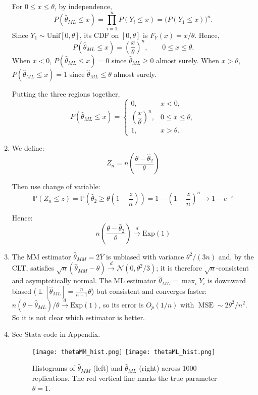 \documentclass[12pt]{article}
\DeclareMathOperator{\E}{\mathbb{E}}
\DeclareMathOperator{\MSE}{MSE}
\begin{document}
\begin{flushleft}
\begin{enumerate}[label=(\alph*)]
For $0\le x\le \theta$, by independence,
\[
P(\hat\theta_{ML} \le x)
= \prod_{i=1}^n P(Y_i \le x)
= \big(P(Y_1 \le x)\big)^n.
\]
Since $Y_1 \sim \mathrm{Unif}[0,\theta]$, its CDF on $[0,\theta]$ is $F_{Y}(x)=x/\theta$. Hence,
\[
P(\hat\theta_{ML} \le x) = \left(\frac{x}{\theta}\right)^n,\qquad 0\le x\le \theta.
\]
When $x<0$, $P(\hat\theta_{ML} \le x)=0$ since $\hat\theta_{ML}\ge 0$ almost surely. When $x>\theta$, $P(\hat\theta_{ML} \le x)=1$ since $\hat\theta_{ML}\le \theta$ almost surely.


Putting the three regions together,
\[
P(\hat\theta_{ML} \le x)
=
\begin{cases}
0, & x<0,\\[6pt]
\left(\dfrac{x}{\theta}\right)^n, & 0\le x \le \theta,\\[10pt]
1, & x>\theta.
\end{cases}
\]
\item

We define:
\[
Z_n = n \left( \frac{\theta - \hat{\theta}_2}{\theta} \right)
\]

Then use change of variable:
\[
\mathbb{P}(Z_n \leq z) = \mathbb{P}\left( \hat{\theta}_2 \geq \theta \left(1 - \frac{z}{n} \right) \right) = 1 - \left(1 - \frac{z}{n} \right)^n \to 1 - e^{-z}
\]

Hence:
\[
n \left( \frac{\theta - \hat{\theta}_2}{\theta} \right) \xrightarrow{d} \text{Exp}(1)
\]

\item 
The MM estimator $\hat\theta_{MM}=2\bar Y$ is unbiased with variance $\theta^2/(3n)$ and, by the CLT, satisfies $\sqrt{n}(\hat\theta_{MM}-\theta)\xrightarrow{d}\mathcal N(0,\theta^2/3)$; it is therefore $\sqrt{n}$-consistent and asymptotically normal. The ML estimator $\hat\theta_{ML}=\max_i Y_i$ is downward biased ($\E[\hat\theta_{ML}]=\tfrac{n}{n+1}\theta$) but consistent and converges faster: $n(\theta-\hat\theta_{ML})/\theta \xrightarrow{d}\mathrm{Exp}(1)$, so its error is $O_p(1/n)$ with $\MSE\sim 2\theta^2/n^2$. So it is not clear which estimator is better.
\item See Stata code in Appendix.
\begin{figure}[h!]
    \centering
    \texttt{[image: thetaMM\_hist.png]}
    \texttt{[image: thetaML\_hist.png]}
    \caption{Histograms of $\hat\theta_{MM}$ (left) and $\hat\theta_{ML}$ (right) across 1000 replications. 
    The red vertical line marks the true parameter $\theta=1$.}
    \label{fig:mmml}
\end{figure}


\end{enumerate}
\end{flushleft}
\end{document}
